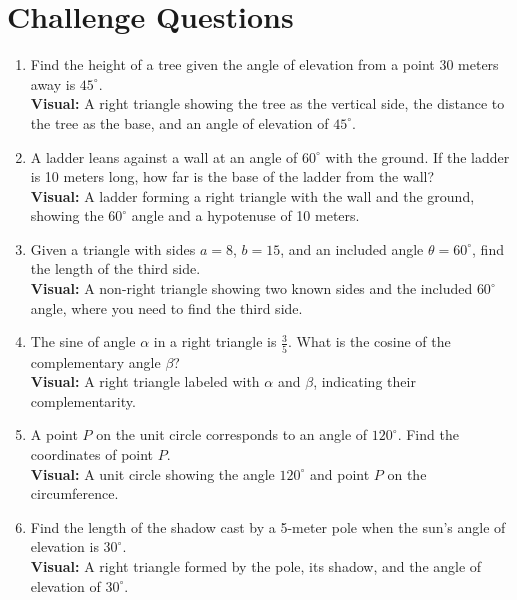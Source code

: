 \section{Challenge Questions}

\begin{enumerate}

    \item Find the height of a tree given the angle of elevation from a point 30 meters away is $45^\circ$.
    \\ 
    \textbf{Visual:} A right triangle showing the tree as the vertical side, the distance to the tree as the base, and an angle of elevation of $45^\circ$.

    \item A ladder leans against a wall at an angle of $60^\circ$ with the ground. If the ladder is 10 meters long, how far is the base of the ladder from the wall?
    \\ 
    \textbf{Visual:} A ladder forming a right triangle with the wall and the ground, showing the $60^\circ$ angle and a hypotenuse of 10 meters.

    \item Given a triangle with sides $a = 8$, $b = 15$, and an included angle $\theta = 60^\circ$, find the length of the third side.
    \\ 
    \textbf{Visual:} A non-right triangle showing two known sides and the included $60^\circ$ angle, where you need to find the third side.

    \item The sine of angle $\alpha$ in a right triangle is $\frac{3}{5}$. What is the cosine of the complementary angle $\beta$?
    \\ 
    \textbf{Visual:} A right triangle labeled with $\alpha$ and $\beta$, indicating their complementarity.

    \item A point $P$ on the unit circle corresponds to an angle of $120^\circ$. Find the coordinates of point $P$.
    \\ 
    \textbf{Visual:} A unit circle showing the angle $120^\circ$ and point $P$ on the circumference.

    \item Find the length of the shadow cast by a 5-meter pole when the sun's angle of elevation is $30^\circ$.
    \\ 
    \textbf{Visual:} A right triangle formed by the pole, its shadow, and the angle of elevation of $30^\circ$.


\end{enumerate}
